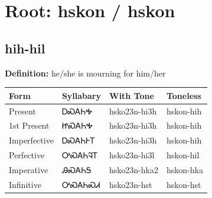 \documentclass{article}%
\begin{document}
%
\normalsize%
\section*{Root: hskon / hskon}%
\subsection*{hih-hil}%
\textbf{Definition: }%
he/she is mourning for him/her%
\\[0.5em]%
\begin{tabular}{|l|l|l|l|}%
\hline%
\textbf{Form}&\textbf{Syllabary}&\textbf{With Tone}&\textbf{Toneless}\\%
\hline%
Present&ᎠᏍᎪᏂᎭ&hsko23n{-}hi3h&hskon{-}hih\\%
1st Present&ᏥᏍᎪᏂᎭ&hsko23n{-}hi3h&hskon{-}hih\\%
Imperfective&ᎠᏍᎪᏂᎰᎢ&hsko23n{-}hi3h&hskon{-}hih\\%
Perfective&ᎤᏍᎪᏂᎸᎢ&hsko23n{-}hi3l&hskon{-}hil\\%
Imperative&ᎯᏍᎪᏂᎦ&hsko23n{-}hka2&hskon{-}hka\\%
Infinitive&ᎤᏍᎪᏂᏍᏗ&hsko23n{-}hst&hskon{-}hst\\%
\hline%
\end{tabular}%
\\[1em]%
\end{document}

